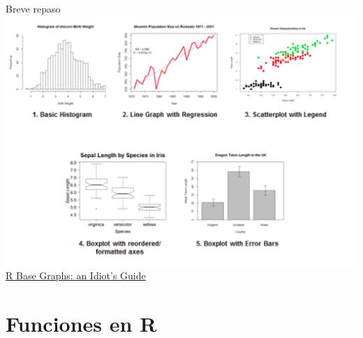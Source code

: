 \documentclass[
  10pt,
  ignorenonframetext,
]{beamer}
\begin{document}
\begin{frame}{Breve repaso}
\protect\hypertarget{breve-repaso-2}{}
\includegraphics{../../imgs/r_base_graphs.png} \vspace{15pt}
\raggedleft \small \href{https://rpubs.com/SusanEJohnston/7953}{R Base
Graphs: an Idiot's Guide}
\end{frame}

\hypertarget{funciones-en-r}{%
\section{Funciones en R}\label{funciones-en-r}}
\end{document}
